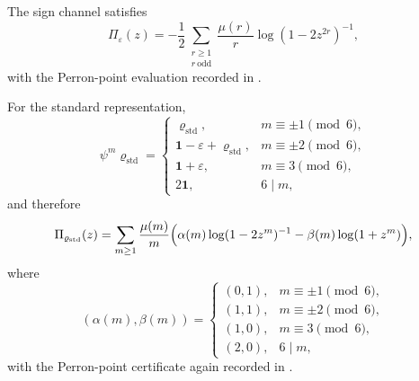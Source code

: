 \begin{proposition}
  \label{prop:s3-example-primitive-channels}
  The sign channel satisfies
  \begin{equation}\label{eq:s3-example-pi-eps}
    \Pi_\varepsilon(z)
    =
    -\frac12
      \sum_{\substack{r\ge 1\\ r\ \mathrm{odd}}}
        \frac{\mu(r)}{r}\log(1-2z^{2r})^{-1},
  \end{equation}
  with the Perron-point evaluation recorded in
  .

  For the standard representation,
  \begin{equation}\label{eq:s3-example-adams-rho}
    \psi^m\varrho_{\mathrm{std}}=
    \begin{cases}
      \varrho_{\mathrm{std}}, & m\equiv \pm 1 \pmod 6, \\
      \mathbf 1-\varepsilon+\varrho_{\mathrm{std}}, & m\equiv \pm 2 \pmod 6, \\
      \mathbf 1+\varepsilon, & m\equiv 3 \pmod 6, \\
      2\mathbf 1, & 6\mid m,
    \end{cases}
  \end{equation}
  and therefore
  \begin{equation}\label{eq:s3-example-pi-rho}
    \Pi_{\varrho_{\mathrm{std}}}(z)
    =
    \sum_{m\ge 1}\frac{\mu(m)}{m}
      \Bigl(
        \alpha(m)\log(1-2z^m)^{-1}
        -\beta(m)\log(1+z^m)
      \Bigr),
  \end{equation}
  where
  \begin{equation}\label{eq:s3-example-alpha-beta}
    (\alpha(m),\beta(m))=
    \begin{cases}
      (0,1), & m\equiv \pm 1 \pmod 6, \\
      (1,1), & m\equiv \pm 2 \pmod 6, \\
      (1,0), & m\equiv 3 \pmod 6, \\
      (2,0), & 6\mid m,
    \end{cases}
  \end{equation}
  with the Perron-point certificate again recorded in
  .
\end{proposition}


